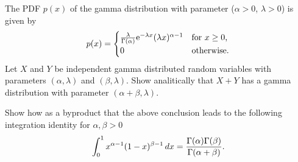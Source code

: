 \begin{problem}
  The PDF \(p(x)\) of the gamma distribution with parameter (\(\alpha>0\),
  \(\lambda>0\)) is given by
  \[
    p(x)=
    \begin{cases}
      \frac{\lambda}{\Gamma(\alpha)}\mathrm{e}^{-\lambda x}(\lambda x)^{\alpha
        -1}
      &\text{for \(x\geq 0\),}\\
      0&\text{otherwise.}
    \end{cases}
  \]
  Let \(X\) and \(Y\) be independent gamma distributed random variables
  with parameters \((\alpha,\lambda)\) and \((\beta,\lambda)\). Show
  analitically that \(X+Y\) has a gamma distribution with parameter
  \((\alpha+\beta,\lambda)\).

  Show how as a byproduct that the above conclusion leads to the following
  integration identity for \(\alpha,\beta>0\)
  \[
    \int_0^1 x^{\alpha-1}(1-x)^{\beta-1}\mathop{}\!d x
    =\frac{\Gamma(\alpha)\Gamma(\beta)}{\Gamma(\alpha+\beta)}.
  \]
\end{problem}
